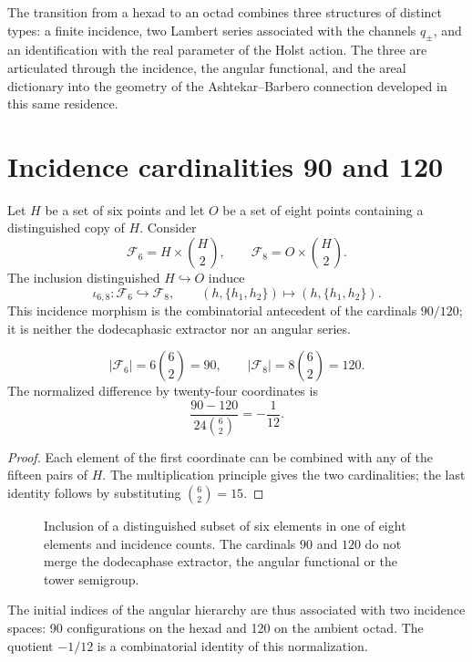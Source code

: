\label{mdg:chap:barbero}

The transition from a hexad to an octad combines three structures of distinct
types: a finite incidence, two Lambert series associated with the
channels \(q_\pm\), and an identification with the real parameter of the Holst
action. The three are articulated through the incidence, the angular functional, and
the areal dictionary into the geometry of the
Ashtekar--Barbero connection developed in this same residence.

\section{Incidence cardinalities 90 and 120}

Let \(H\) be a set of six points and let \(O\) be a set of eight points
containing a distinguished copy of \(H\). Consider
\[
 \mathcal F_6=H\times\binom H2,
 \qquad
 \mathcal F_8=O\times\binom H2.
\]
The inclusion distinguished \(H\hookrightarrow O\) induce
\[
 \iota_{6,8}:\mathcal F_6\hookrightarrow\mathcal F_8,
 \qquad
 (h,\{h_1,h_2\})\longmapsto(h,\{h_1,h_2\}).
\]
This incidence morphism is the combinatorial antecedent of the
cardinals \(90/120\); it is neither the dodecaphasic extractor nor an angular series.

\begin{theorem}
\[
 |\mathcal F_6|=6\binom62=90,
 \qquad
 |\mathcal F_8|=8\binom62=120.
\]
The normalized difference by twenty-four coordinates is
\[
 \frac{90-120}{24\binom62}=-\frac1{12}.
\]
\end{theorem}
\begin{proof}
Each element of the first coordinate can be combined with any of the
fifteen pairs of \(H\). The multiplication principle gives the two cardinalities;
the last identity follows by substituting \(\binom62=15\).
\end{proof}

\begin{figure}[htbp]
\centering

\caption{Inclusion of a distinguished subset of six elements in one of
eight elements and incidence counts. The cardinals \(90\) and \(120\) do not merge the
dodecaphase extractor, the angular functional or the tower semigroup.}
\label{mdg:fig:incidencia-seis-ocho-rev9}
\end{figure}

The initial indices of the angular hierarchy are thus associated with two
incidence spaces: 90 configurations on the hexad and 120 on the ambient
octad. The quotient \(-1/12\) is a combinatorial identity of this
normalization.

